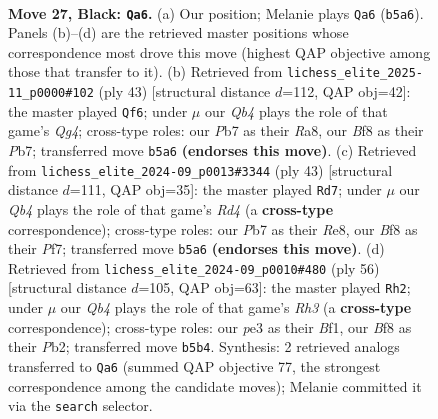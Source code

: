 \documentclass[11pt]{article}
\begin{document}
\clearpage

\begin{figure}[p]\centering
\begin{subfigure}{0.46\textwidth}\centering
\resizebox{\linewidth}{!}{%
\newchessgame
\chessboard[
  setfen={rk3b2/pp4pr/2p1b2p/Pq1p1p2/3P3P/2B1PN2/1PK2PP1/1R3QR1 b - - 6 27},
  showmover=false,
  pgfstyle=straightmove, color=movearrow, markmove={b5-a6}
]}
\caption{}
\end{subfigure}\hfill
\begin{subfigure}{0.46\textwidth}\centering
\resizebox{\linewidth}{!}{%
\newchessgame
\chessboard[
  setfen={r4rk1/1p3ppp/2pn2b1/p2p2q1/P2P4/1QP2N1P/1P3PP1/R3RBK1 b - - 1 22},
  showmover=false,
  pgfstyle=straightmove, color=movearrow, markmove={g5-f6}
]}
\caption{}
\end{subfigure}
\\[4pt]
\begin{subfigure}{0.46\textwidth}\centering
\resizebox{\linewidth}{!}{%
\newchessgame
\chessboard[
  setfen={4r1k1/1p2qppp/1bn5/p2r4/3p4/PP3QP1/1B1NPP1P/2R1R1K1 b - - 1 22},
  showmover=false,
  pgfstyle=straightmove, color=movearrow, markmove={d5-d7}
]}
\caption{}
\end{subfigure}\hfill
\begin{subfigure}{0.46\textwidth}\centering
\resizebox{\linewidth}{!}{%
\newchessgame
\chessboard[
  setfen={k2q2rr/pp2np2/2p1b3/2QpP2p/3P1B2/2R1P2R/PP3PP1/K4B2 w - - 3 29},
  showmover=false,
  pgfstyle=straightmove, color=movearrow, markmove={h3-h2}
]}
\caption{}
\end{subfigure}
\caption{\textbf{Move 27, Black: \texttt{Qa6}.} (a) Our position; Melanie plays \texttt{Qa6} (\texttt{b5a6}). Panels (b)--(d) are the retrieved master positions whose correspondence most drove this move (highest QAP objective among those that transfer to it). (b) Retrieved from \texttt{lichess\_elite\_2025-11\_p0000\#102} (ply 43) [structural distance $d$=112, QAP obj=42]: the master played \texttt{Qf6}; under $\mu$ our \emph{Qb4} plays the role of that game's \emph{Qg4}; cross-type roles: our \emph{P}b7 as their \emph{R}a8, our \emph{B}f8 as their \emph{P}b7; transferred move \texttt{b5a6} \textbf{(endorses this move)}. (c) Retrieved from \texttt{lichess\_elite\_2024-09\_p0013\#3344} (ply 43) [structural distance $d$=111, QAP obj=35]: the master played \texttt{Rd7}; under $\mu$ our \emph{Qb4} plays the role of that game's \emph{Rd4} (a \textbf{cross-type} correspondence); cross-type roles: our \emph{P}b7 as their \emph{R}e8, our \emph{B}f8 as their \emph{P}f7; transferred move \texttt{b5a6} \textbf{(endorses this move)}. (d) Retrieved from \texttt{lichess\_elite\_2024-09\_p0010\#480} (ply 56) [structural distance $d$=105, QAP obj=63]: the master played \texttt{Rh2}; under $\mu$ our \emph{Qb4} plays the role of that game's \emph{Rh3} (a \textbf{cross-type} correspondence); cross-type roles: our \emph{p}e3 as their \emph{B}f1, our \emph{B}f8 as their \emph{P}b2; transferred move \texttt{b5b4}. Synthesis: 2 retrieved analogs transferred to \texttt{Qa6} (summed QAP objective 77, the strongest correspondence among the candidate moves); Melanie committed it via the \texttt{search} selector.}
\label{fig:thought-m53}
\end{figure}
\end{document}
